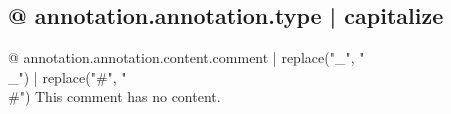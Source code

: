 \subsection{{@ annotation.annotation.type | capitalize }}

{@ annotation.annotation.content.comment | replace("_", "\\_") | replace("#", "\\#") }
This comment has no content.
